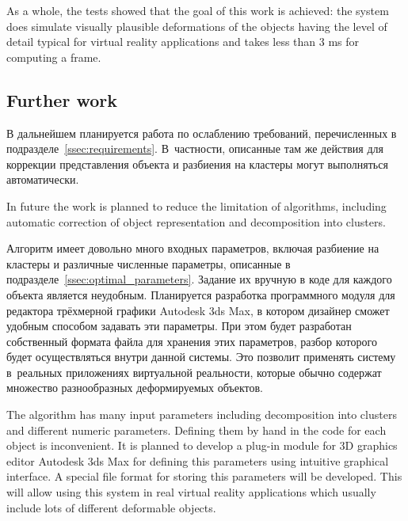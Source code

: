 \documentclass[a4paper, 12pt, titlepage]{extarticle}
\begin{document}
        As a whole, the tests showed that the goal of this work is achieved: the system does
        simulate visually plausible deformations of the objects having the level of detail typical
        for virtual reality applications and takes less than 3 ms for computing a frame.

\begin{original}

  \section{Further work}

\begin{original}
    В дальнейшем планируется работа по ослаблению требований, перечисленных
    в подразделе~\ref{ssec:requirements}. В~частности, описанные там же действия для коррекции
    представления объекта и разбиения на кластеры могут выполняться автоматически.
\end{original}

    In future the work is planned to reduce the limitation of algorithms, including automatic
    correction of object representation and decomposition into clusters.

\begin{original}
    Алгоритм имеет довольно много входных параметров, включая разбиение на кластеры и
    различные численные параметры, описанные в подразделе~\ref{ssec:optimal_parameters}. Задание их вручную в коде для каждого
    объекта является неудобным. Планируется разработка программного модуля для редактора
    трёхмерной графики Autodesk 3ds Max, в котором дизайнер сможет удобным способом задавать эти параметры. При этом
    будет разработан собственный формата файла для хранения этих параметров, разбор которого будет
    осуществляться внутри данной системы. Это позволит применять систему в~реальных приложениях
    виртуальной реальности, которые обычно содержат множество разнообразных деформируемых объектов.
\end{original}

    The algorithm has many input parameters including decomposition into clusters and different
    numeric parameters. Defining them by hand in the code for each object is inconvenient. It is
    planned to develop a plug-in module for 3D graphics editor Autodesk 3ds Max for defining this
    parameters using intuitive graphical interface. A special file format for storing this
    parameters will be developed. This will allow using this system in real virtual reality
    applications which usually include lots of different deformable objects.


\end{original}
\end{document}

